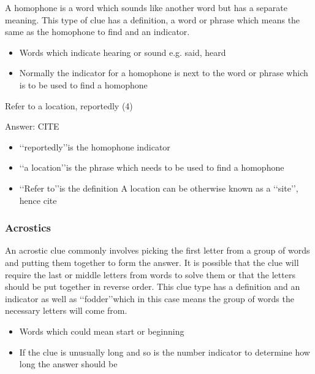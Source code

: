 A homophone is a word which sounds like another word but has a separate meaning. This type of clue has a definition, a word or phrase which means the same as the homophone to find and an indicator. 

\begin{itemize} 
	\item Words which indicate hearing or sound e.g. said, heard 
	\item Normally the indicator for a homophone is next to the word or phrase which is to be used to find a homophone  
\end{itemize}


Refer to a location, reportedly (4) 

Answer: CITE 

\begin{itemize}
	\item \lq\lq reportedly\rq\rq is the homophone indicator 
	\item \lq\lq a location\rq\rq is the phrase which needs to be used to find a homophone 
	\item\lq\lq Refer to\rq\rq is the definition 
	A location can be otherwise known as a \lq\lq site\rq\rq, hence cite 
\end{itemize}

\subsubsection{Acrostics}

An acrostic clue commonly involves picking the first letter from a group of words and putting them together to form the answer. It is possible that the clue will require the last or middle letters from words to solve them or that the letters should be put together in reverse order. This clue type has a definition and an indicator as well as \lq\lq fodder\rq\rq which in this case means the group of words the necessary letters will come from. 

\begin{itemize}
 	\item Words which could mean start or beginning 
	\item If the clue is unusually long and so is the number indicator to determine how long the answer should be 
\end{itemize}


